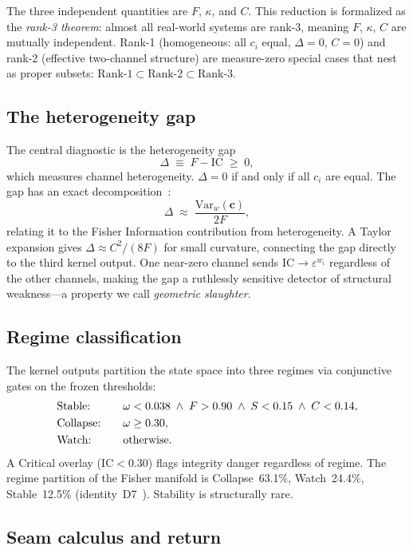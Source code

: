 \documentclass[
  aps,
  prd,
  twocolumn,
  superscriptaddress,
  nofootinbib,
  floatfix
]{revtex4-2}
\newcommand{\eps}{\varepsilon}
\newcommand{\beq}{\begin{equation}}
\newcommand{\eeq}{\end{equation}}
\newcommand{\tvec}{\mathbf{c}}
\newcommand{\IC}{\mathrm{IC}}
\begin{document}
\noindent The three independent quantities are $F$, $\kappa$, and $C$.
This reduction is formalized as the \emph{rank-3 theorem}: almost all
real-world systems are rank-3, meaning $F$, $\kappa$, $C$ are mutually
independent.  Rank-1 (homogeneous: all $c_i$ equal, $\Delta = 0$,
$C = 0$) and rank-2 (effective two-channel structure) are measure-zero
special cases that nest as proper subsets:
$\text{Rank-1} \subset \text{Rank-2} \subset \text{Rank-3}$.

\subsection{The heterogeneity gap}

The central diagnostic is the heterogeneity gap
\beq\label{eq:gap}
  \Delta \;\equiv\; F - \IC \;\geq\; 0,
\eeq
which measures channel heterogeneity.  $\Delta = 0$ if and only if all
$c_i$ are equal.  The gap has an exact
decomposition~\cite{paulus2025physicscoherence}:
\beq\label{eq:gap-fisher}
  \Delta \;\approx\; \frac{\mathrm{Var}_w(\tvec)}{2F},
\eeq
relating it to the Fisher Information contribution from heterogeneity.
A Taylor expansion gives $\Delta \approx C^2/(8F)$ for small
curvature, connecting the gap directly to the third kernel output.
One near-zero channel sends $\IC \to \eps^{w_i}$ regardless of the
other channels, making the gap a ruthlessly sensitive detector of
structural weakness---a property we call \emph{geometric slaughter}.

\subsection{Regime classification}

The kernel outputs partition the state space into three regimes via
conjunctive gates on the frozen thresholds:
\begin{alignat}{2}
  &\text{Stable:} &\quad& \omega < 0.038 \;\wedge\; F > 0.90
    \;\wedge\; S < 0.15 \;\wedge\; C < 0.14, \notag\\
  &\text{Collapse:} && \omega \geq 0.30, \label{eq:regimes}\\
  &\text{Watch:} && \text{otherwise}. \notag
\end{alignat}
A Critical overlay ($\IC < 0.30$) flags integrity danger regardless
of regime.  The regime partition of the Fisher manifold is
Collapse~63.1\%, Watch~24.4\%, Stable~12.5\%
(identity~D7~\cite{umcpmetadatarepo}).  Stability is structurally
rare.

\subsection{Seam calculus and return}
\end{document}
